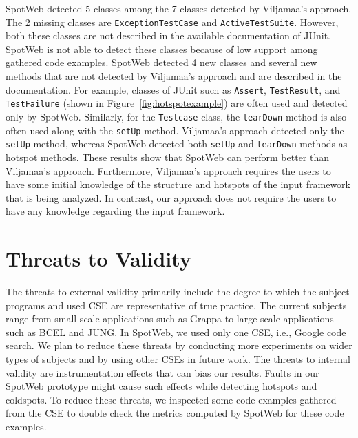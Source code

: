 \documentclass[conference]{IEEEtran}
\newcommand{\CodeIn}[1]{{\small\texttt{#1}}}
\begin{document}
SpotWeb detected 5 classes among the 7 classes detected by Viljamaa's approach. The 2 missing classes
are \CodeIn{ExceptionTestCase} and \CodeIn{ActiveTestSuite}. However, both
these classes are not described in the available documentation of JUnit.
SpotWeb is not able to detect these classes because of low 
support among gathered code examples. SpotWeb detected 4 new classes and several
new methods that are not detected by Viljamaa's approach and are described in the documentation. 
For example, classes of JUnit such as \CodeIn{Assert}, \CodeIn{TestResult},
and \CodeIn{TestFailure} (shown in Figure~\ref{fig:hotspotexample}) 
are often used and detected only by SpotWeb. Similarly, for the
\CodeIn{Testcase} class, the \CodeIn{tearDown} method is also often used along with
the \CodeIn{setUp} method. Viljamaa's approach detected only the \CodeIn{setUp} method, whereas
SpotWeb detected both \CodeIn{setUp} and \CodeIn{tearDown} methods as hotspot methods.
These results show that SpotWeb can perform better than Viljamaa's approach.
Furthermore, Viljamaa's approach requires the users to have 
some initial knowledge of the structure and hotspots of the input framework that is being analyzed.
In contrast, our approach does not require the users to have any knowledge regarding the 
input framework.

\section{Threats to Validity}
\label{sec:threats}
The threats to external validity primarily include the degree to
which the subject programs and used CSE are representative of true
practice. The current subjects range from small-scale applications
such as Grappa to large-scale applications such as BCEL and JUNG. In
SpotWeb, we used only one CSE, i.e., Google code search. We plan to
reduce these threats by conducting more experiments on wider types
of subjects and by using other CSEs in future work. The threats to
internal validity are instrumentation effects that can bias our
results. Faults in our SpotWeb prototype might cause such effects
while detecting hotspots and coldspots. To reduce these threats, we
inspected some code examples gathered from the CSE to double check
the metrics computed by SpotWeb for these code examples.\vspace{-1ex}
\end{document}
